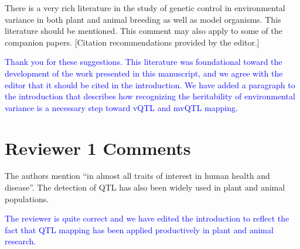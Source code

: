 \documentclass[11pt]{article}
\newcommand{\ReviewerQuestion}[1]{
  \vspace{5pt}\goodbreak
  \noindent\fbox{Reviewer:} #1
  \normalfont\par
}
\newcommand{\EditorQuestion}[1]{
  \vspace{5pt}\goodbreak
  \noindent\fbox{Editor:} #1
  \normalfont\par
}
\newcommand{\Response}[1]{
  \goodbreak
  \textcolor{blue}{#1}
  \normalfont\par
}
\begin{document}
\EditorQuestion{
  There is a very rich literature in the study of genetic control in environmental variance in both plant and animal breeding as well as model organisms.
  This literature should be mentioned. This comment may also apply to some of the companion papers.
  [Citation recommendations provided by the editor.]
}
\Response{
  Thank you for these suggestions. 
  This literature was foundational toward the development of the work presented in this manuscript, and we agree with the editor that it should be cited in the introduction.
  We have added a paragraph to the introduction that describes how recognizing the heritability of environmental variance is a necessary step toward vQTL and mvQTL mapping.
}







\section*{Reviewer 1 Comments}

\ReviewerQuestion{
  The authors mention ``in almost all traits of interest in human health and disease''.
  The detection of QTL has also been widely used in plant and animal populations.
}
\Response{
  The reviewer is quite correct and we have edited the introduction to reflect the fact that QTL mapping has been applied productively in plant and animal research.
}
\end{document}
